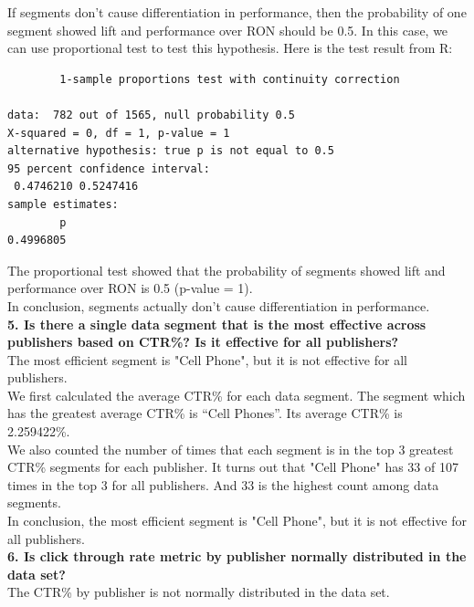 \documentclass[12pt]{article}
\begin{document}
If segments don't cause differentiation in performance, then the probability of one segment showed lift and performance over RON should be 0.5. In this case, we can use proportional test to test this hypothesis. Here is the test result from R:

\begin{verbatim}
        1-sample proportions test with continuity correction

data:  782 out of 1565, null probability 0.5
X-squared = 0, df = 1, p-value = 1
alternative hypothesis: true p is not equal to 0.5
95 percent confidence interval:
 0.4746210 0.5247416
sample estimates:
        p
0.4996805
\end{verbatim}

The proportional test showed that the probability of segments showed lift and performance over RON is 0.5 (p-value = 1). \\

In conclusion, segments actually don't cause differentiation in performance. \\

{\bf 5.	Is there a single data segment that is the most effective across publishers based on CTR\%? Is it effective for all publishers?} \\

The most efficient segment is "Cell Phone", but it is not effective for all publishers. \\

We first calculated the average CTR\% for each data segment. The segment which has the greatest average CTR\% is ``Cell Phones''. Its average CTR\% is 2.259422\%. \\

We also counted the number of times that each segment is in the top 3 greatest CTR\% segments for each publisher. It turns out that "Cell Phone" has 33 of 107 times in the top 3 for all publishers. And 33 is the highest count among data segments. \\

In conclusion, the most efficient segment is "Cell Phone", but it is not effective for all publishers. \\

{\bf 6. Is click through rate metric by publisher normally distributed in the data set?} \\

The CTR\% by publisher is not normally distributed in the data set. \\
\end{document}
